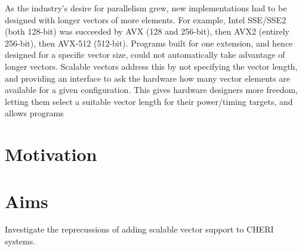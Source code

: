 As the industry's desire for parallelism grew, new implementations had to be designed with longer vectors of more elements.
For example, Intel SSE/SSE2 (both 128-bit) was succeeded by AVX (128 and 256-bit), then AVX2 (entirely 256-bit), then AVX-512 (512-bit).
Programs built for one extension, and hence designed for a specific vector size, could not automatically take advantage of longer vectors.
Scalable vectors address this by not specifying the vector length, and providing an interface to ask the hardware how many vector elements are available for a given configuration. 
This gives hardware designers more freedom, letting them select a suitable vector length for their power/timing targets, and allows programs 



\section{Motivation}




\section{Aims}

Investigate the reprecussions of adding scalable vector support to CHERI systems.



